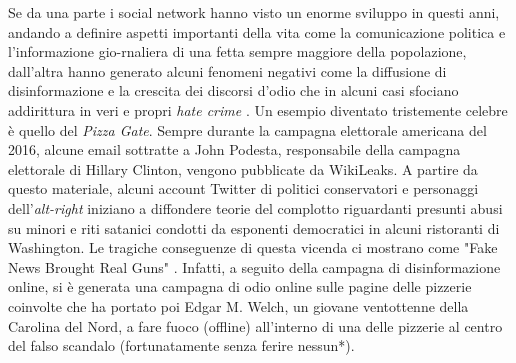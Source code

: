 Se da una parte i social network hanno visto un enorme sviluppo in questi anni, andando a definire aspetti importanti della vita come la comunicazione politica e l'informazione gio-rnaliera di una fetta sempre maggiore della popolazione, dall'altra hanno generato alcuni fenomeni negativi come la diffusione di disinformazione e la crescita dei discorsi d'odio che in alcuni casi sfociano addirittura in veri e propri \textit{hate crime} \citep{chan2015}.
Un esempio diventato tristemente celebre è quello del \textit{Pizza Gate}. Sempre durante la campagna elettorale americana del 2016, alcune email sottratte a John Podesta, responsabile della campagna elettorale di Hillary Clinton, vengono pubblicate da WikiLeaks. A partire da questo materiale, alcuni account Twitter di politici conservatori e  personaggi dell'\textit{alt-right} iniziano a diffondere teorie del complotto riguardanti presunti abusi su minori e riti satanici condotti da esponenti democratici in alcuni ristoranti di Washington. Le tragiche conseguenze di questa vicenda ci mostrano come "Fake News Brought Real Guns" \citep{Kang2016}. Infatti, a seguito della campagna di disinformazione online, si è generata una campagna di odio online sulle pagine delle pizzerie coinvolte che ha portato poi Edgar M. Welch, un giovane ventottenne della Carolina del Nord, a fare fuoco (offline) all'interno di una delle pizzerie al centro del falso scandalo (fortunatamente senza ferire nessun*).

